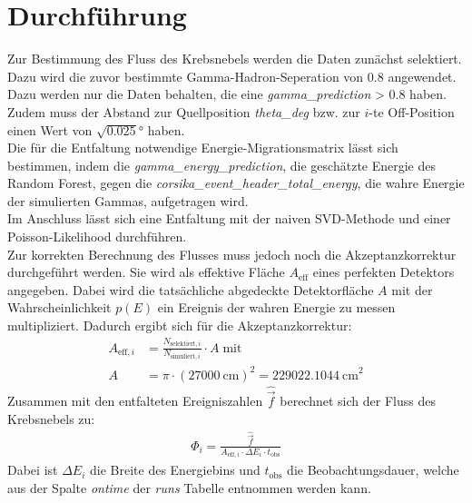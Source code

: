 \section{Durchführung}
Zur Bestimmung des Fluss des Krebsnebels werden die Daten zunächst selektiert. Dazu wird die zuvor bestimmte Gamma-Hadron-Seperation von $0.8$ angewendet. Dazu werden nur die Daten behalten, die eine \textit{gamma\_prediction} \textgreater \; $0.8$ haben. Zudem muss der Abstand zur Quellposition \textit{theta\_deg} bzw. zur $i$-te Off-Position einen Wert von $\sqrt{0.025}\si{\degree}$ haben.\\
Die für die Entfaltung notwendige Energie-Migrationsmatrix lässt sich bestimmen, indem die \textit{gamma\_energy\_prediction}, die geschätzte Energie des Random Forest, gegen die \textit{corsika\_event\_header\_total\_energy}, die wahre Energie der simulierten Gammas, aufgetragen wird.\\
Im Anschluss lässt sich eine Entfaltung mit der naiven SVD-Methode und einer Poisson-Likelihood durchführen.\\
Zur korrekten Berechnung des Flusses muss jedoch noch die Akzeptanzkorrektur durchgeführt werden. Sie wird als effektive Fläche $A_{\text{eff}}$ eines perfekten Detektors angegeben. Dabei wird die tatsächliche abgedeckte Detektorfläche $A$ mit der Wahrscheinlichkeit $p(E)$ ein Ereignis der wahren Energie zu messen multipliziert. Dadurch ergibt sich für die Akzeptanzkorrektur:\\
\begin{align}
	A_{\text{eff},i} &= \frac{N_{\text{selektiert},i}}{N_{\text{simuliert},i}} \cdot A \; \text{mit}\\
	A &= \pi \cdot (\SI{27000}{\centi\meter})^2 = \SI{229022.1044}{\centi\meter}^2
	\label{eqn:Aeff}
\end{align}
Zusammen mit den entfalteten Ereigniszahlen $\hat{\vec{f}}$ berechnet sich der Fluss des Krebsnebels zu:
\begin{align}
	\Phi_{i} = \frac{\hat{\vec{f}}}{A_{\text{eff},i} \cdot \Delta E_{i} \cdot t_{\text{obs}}}
	\label{eqn:phi}
\end{align}
Dabei ist $\Delta E_{i}$ die Breite des Energiebins und $t_{\text{obs}}$ die Beobachtungsdauer, welche aus der Spalte \textit{ontime} der \textit{runs} Tabelle entnommen werden kann.
